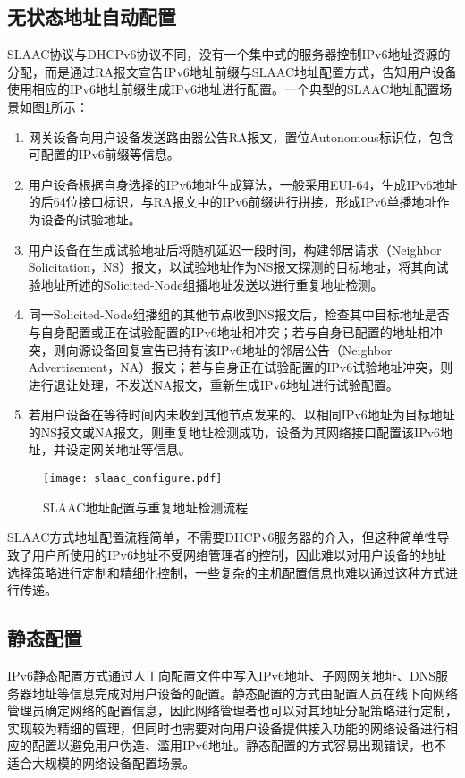     \subsection{无状态地址自动配置}
    \label{survey:configuration:SLAAC}
    SLAAC协议\cite{RFC2462}与DHCPv6协议不同，没有一个集中式的服务器控制IPv6地址资源的分配，而是通过RA报文宣告IPv6地址前缀与SLAAC地址配置方式，告知用户设备使用相应的IPv6地址前缀生成IPv6地址进行配置。一个典型的SLAAC地址配置场景如图\ref{fig:slaac_configure}所示：
    \begin{enumerate}[1{)}]
      \item 网关设备向用户设备发送路由器公告RA报文，置位Autonomous标识位，包含可配置的IPv6前缀等信息。
      \item 用户设备根据自身选择的IPv6地址生成算法，一般采用EUI-64，生成IPv6地址的后64位接口标识，与RA报文中的IPv6前缀进行拼接，形成IPv6单播地址作为设备的试验地址。
      \item 用户设备在生成试验地址后将随机延迟一段时间，构建邻居请求（Neighbor Solicitation，NS）报文，以试验地址作为NS报文探测的目标地址，将其向试验地址所述的Solicited-Node组播地址发送以进行重复地址检测。
      \item 同一Solicited-Node组播组的其他节点收到NS报文后，检查其中目标地址是否与自身配置或正在试验配置的IPv6地址相冲突；若与自身已配置的地址相冲突，则向源设备回复宣告已持有该IPv6地址的邻居公告（Neighbor Advertisement，NA）报文；若与自身正在试验配置的IPv6试验地址冲突，则进行退让处理，不发送NA报文，重新生成IPv6地址进行试验配置。
      \item 若用户设备在等待时间内未收到其他节点发来的、以相同IPv6地址为目标地址的NS报文或NA报文，则重复地址检测成功，设备为其网络接口配置该IPv6地址，并设定网关地址等信息。
    \end{enumerate}

    \begin{figure}[ht]
      \centering
      \texttt{[image: slaac\_configure.pdf]}
      \caption{SLAAC地址配置与重复地址检测流程}
      \label{fig:slaac_configure}
    \end{figure}

    SLAAC方式地址配置流程简单，不需要DHCPv6服务器的介入，但这种简单性导致了用户所使用的IPv6地址不受网络管理者的控制，因此难以对用户设备的地址选择策略进行定制和精细化控制，一些复杂的主机配置信息也难以通过这种方式进行传递。

    \subsection{静态配置}
    \label{survey:configuration:manual}
    IPv6静态配置方式通过人工向配置文件中写入IPv6地址、子网网关地址、DNS服务器地址等信息完成对用户设备的配置。静态配置的方式由配置人员在线下向网络管理员确定网络的配置信息，因此网络管理者也可以对其地址分配策略进行定制，实现较为精细的管理，但同时也需要对向用户设备提供接入功能的网络设备进行相应的配置以避免用户伪造、滥用IPv6地址。静态配置的方式容易出现错误，也不适合大规模的网络设备配置场景。
  
